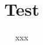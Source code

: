 \documentclass[10pt,journal,compsoc]{IEEEtran}
\begin{document}
%
\title{Test}
%
%
%
%


\author{xxx%
        }
\end{document}
